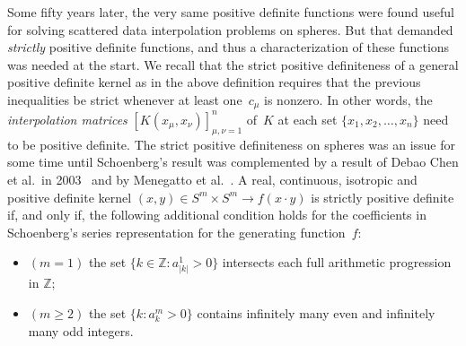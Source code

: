 Some f\/ifty years later, the very same positive def\/inite functions were found useful for solving scattered data interpolation problems on spheres. But that demanded {\em strictly} positive def\/inite functions, and thus a characterization of these functions was needed at the start. We recall that the strict positive def\/initeness of a general positive def\/inite kernel as in the above def\/inition requires that the previous inequalities be strict whenever at least one~$c_\mu$ is nonzero. In other words, the {\em interpolation matrices} $[K(x_\mu , x_\nu)]_{\mu,\nu=1}^n$ of~$K$ at each set $\{x_1, x_2, \ldots, x_n\}$ need to be positive def\/inite. The strict positive def\/initeness on spheres was an issue for some time until Schoenberg's result was complemented by a result of Debao Chen et al.\ in 2003~\cite{chen} and by Menegatto et al.~\cite{menegatto}. A real, continuous, isotropic and positive def\/inite kernel $(x,y) \in S^m \times S^m \to f(x \cdot y)$ is strictly positive def\/inite if, and only if, the following additional condition holds for the coef\/f\/icients in Schoenberg's series representation for the generating function~$f$:
\begin{itemize}\itemsep=0pt
\item[--] $(m=1)$ the set $\{k \in \mathbb{Z}\colon a_{|k|}^1>0\}$ intersects each full arithmetic progression in $\mathbb{Z}$;
\item[--] $(m\geq 2)$ the set $\{k \colon a_k^m >0\}$ contains inf\/initely many even and inf\/initely many odd integers.
\end{itemize}
